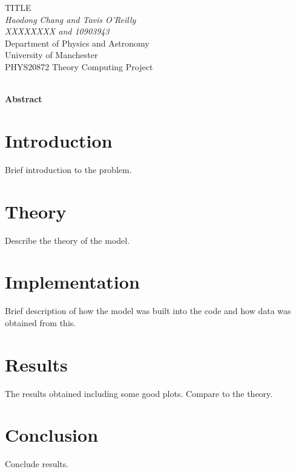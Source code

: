 \documentclass[11pt]{article}
\begin{document}
	
	\begin{titlepage}
		\begin{center}
			{\Huge TITLE}\\[0.5cm]
			\textit{Haodong Chang and Tavis O'Reilly}\\[0.3cm]
			\textit{XXXXXXXX and 10903943}\\[0.3cm]
			Department of Physics and Astronomy\\[0.3cm]
			University of Manchester\\[0.3cm]
			PHYS20872 Theory Computing Project\\[0.3cm]
			\shortmonthname[\the\month]  \the\year \\[4cm]
			
		\end{center}
		
		{\Large \textbf{Abstract}}\\[0.3cm]
		
		
	\end{titlepage}
	
	\clearpage
	\setcounter{page}{2}
	
	\newpage
	
	\section{Introduction}
	
	Brief introduction to the problem.
	
	\section{Theory}
	
	Describe the theory of the model.
	
	\section{Implementation}
	
	Brief description of how the model was built into the code and how data was obtained from this.
	
	\section{Results}
	
	The results obtained including some good plots. Compare to the theory.
	
	\section{Conclusion}
	
	Conclude results.
	
\end{document}
